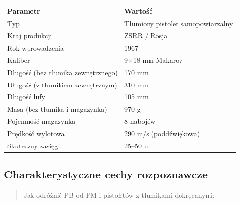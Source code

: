 \documentclass[12pt,oneside]{book}
\begin{document}
\begin{longtable}[]{@{}ll@{}}
\toprule\noalign{}
Parametr & Wartość \\
\midrule\noalign{}
\endhead
\bottomrule\noalign{}
\endlastfoot
Typ & Tłumiony pistolet samopowtarzalny \\
Kraj produkcji & ZSRR / Rosja \\
Rok wprowadzenia & 1967 \\
Kaliber & 9×18 mm Makarov \\
Długość (bez tłumika zewnętrznego) & 170 mm \\
Długość (z tłumikiem zewnętrznym) & 310 mm \\
Długość lufy & 105 mm \\
Masa (bez tłumika i magazynka) & 970 g \\
Pojemność magazynka & 8 nabojów \\
Prędkość wylotowa & 290 m/s (poddźwiękowa) \\
Skuteczny zasięg & 25--50 m \\
\end{longtable}

\subsection{Charakterystyczne cechy
rozpoznawcze}\label{charakterystyczne-cechy-rozpoznawcze-104}

\begin{quote}
Jak odróżnić PB od PM i pistoletów z tłumikami dokręcanymi:
\end{quote}
\end{document}
